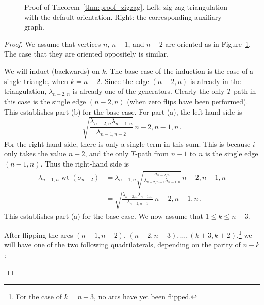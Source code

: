 \documentclass[pdftex]{sigma}
\newcommand{\midarrow}{\tikz \draw[-triangle 90] (0,0) -- +(.1,0);}
\numberwithin{equation}{section}
\DeclareMathOperator{\wt}{wt}
\begin{document}
\begin{figure}[h]\centering

\caption{Proof of Theorem~\ref{thm:proof_zigzag}.
{Left:} zig-zag triangulation with the default orientation.
{Right:} the corresponding auxiliary graph.}\label{fig:proof_zigzag}
\end{figure}

\begin{proof}
 We assume that vertices $n$, $n-1$, and $n-2$ are oriented as in Figure~\ref{fig:proof_zigzag}. The case that they are oriented oppositely is similar.

 We will induct (backwards) on $k$.
 The base case of the induction is the case of a single triangle, when $k=n-2$.
 Since the edge $(n-2,n)$ is already in the triangulation, $\lambda_{n-2,n}$ is already one of the generators. Clearly the only $T$-path
 in this case is the single edge $(n-2,n)$ (when zero flips have been performed). This establishes part (b) for the base case.
 For part (a), the left-hand side is
 \[ \sqrt{\frac{\lambda_{n-2,n}\lambda_{n-1,n}}{\lambda_{n-1,n-2}}} \, \boxed{n-2,n-1,n}\,. \]
 For the right-hand side, there is only a single term in this sum. This is because $i$ only takes the value $n-2$,
 and the only $T$-path from $n-1$ to $n$ is the single edge $(n-1,n)$. Thus the right-hand side is
 \begin{align*}
 \lambda_{n-1,n}   \wt(\sigma_{n-2}) &= \lambda_{n-1,n}   \sqrt{\frac{\lambda_{n-2,n}}{\lambda_{n-2,n-1}\lambda_{n-1,n}}} \, \boxed{n-2,n-1,n} \\
 &= \sqrt{\frac{\lambda_{n-2,n}\lambda_{n-1,n}}{\lambda_{n-2,n-1}}} \, \boxed{n-2,n-1,n}\,.
 \end{align*}
 This establishes part (a) for the base case. We now assume that $1 \leq k \leq n-3$.

 After flipping the arcs $(n-1,n-2)$, $(n-2,n-3), \dots, (k+3,k+2)$,\footnote{For the case of $k=n-3$, no arcs have yet been flipped.} we will have one of the two following quadrilaterals, depending on the parity of $n-k$:
 \begin {center}
 \end {center}



\end{proof}
\end{document}
